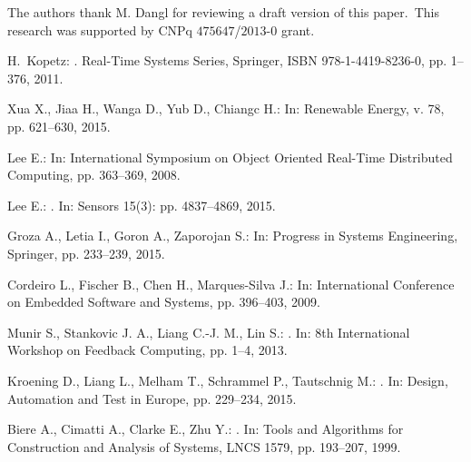 \documentclass{acm_sen_article}
\begin{document}
The authors thank M. Dangl for reviewing a draft version of this paper.~This research was supported by CNPq $475647$/$2013$-$0$ grant.



\begin{thebibliography}{1}

H.~Kopetz:
.
\newblock Real-Time Systems Series, Springer, ISBN 978-1-4419-8236-0, pp. 1--376, 2011.

Xua X., Jiaa H., Wanga D., Yub D., Chiangc H.:
\newblock In: Renewable Energy, v. 78, pp. 621--630, 2015.

Lee E.:
\newblock In: International Symposium on Object Oriented Real-Time Distributed Computing, pp. 363--369, 2008.

Lee E.:
. 
\newblock In: Sensors 15(3): pp. 4837--4869, 2015.

Groza A., Letia I., Goron A., Zaporojan S.: 
\newblock In: Progress in Systems Engineering, Springer, pp. 233--239, 2015.

Cordeiro L., Fischer B., Chen H., Marques-Silva J.:
\newblock In: International Conference on Embedded Software and Systems, pp. 396--403, 2009.

Munir  S., Stankovic J. A., Liang C.-J. M., Lin S.:
. 
\newblock In: 8th International Workshop on Feedback Computing, pp. 1--4, 2013.

Kroening D., Liang L., Melham T., Schrammel P., Tautschnig M.:
. 
\newblock In: Design, Automation and Test in Europe, pp. 229--234, 2015.

Biere A., Cimatti A., Clarke E., Zhu Y.:
. 
\newblock In: Tools and Algorithms for Construction and Analysis of Systems, LNCS 1579, pp. 193--207, 1999.


\end{thebibliography}
\end{document}
